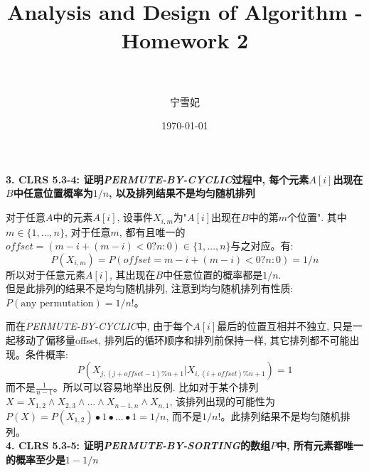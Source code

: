 \documentclass[paper=a4, fontsize=11pt]{scrartcl} %
\title{	
\normalfont \normalsize 
\horrule{0.5pt} \\[0.4cm] %
\huge Analysis and Design of Algorithm - Homework 2\\ %
\horrule{2pt} \\[0.5cm] %
}
\author{宁雪妃} %
\date{\normalsize\today} %
\numberwithin{equation}{section} %
\numberwithin{figure}{section} %
\numberwithin{table}{section} %
\begin{document}
\maketitle %



\textbf{3. CLRS 5.3-4: 证明\textit{PERMUTE-BY-CYCLIC}过程中, 每个元素$A[i]$出现在$B$中任意位置概率为$1/n$, 以及排列结果不是均匀随机排列}

对于任意$A$中的元素$A[i]$, 设事件$X_{i,m}$为"$A[i]$出现在$B$中的第$m$个位置". 其中$m \in \{1, \dots, n\}$, 对于任意$m$, 都有且唯一的$offset = (m - i + (m - i) < 0? n:0) \in \{1, \dots, n\}$与之对应。有:
\[
P(X_{i,m}) = P(offset = m - i + (m - i) < 0? n:0) = 1/n
\]
所以对于任意元素$A[i]$, 其出现在$B$中任意位置的概率都是$1/n$.
\\[2ex]
但是此排列的结果不是均匀随机排列, 注意到均匀随机排列有性质: $P(\mbox{any permutation}) = 1/n!$。

而在\textit{PERMUTE-BY-CYCLIC}中, 由于每个$A[i]$最后的位置互相并不独立, 只是一起移动了偏移量offset, 排列后的循环顺序和排列前保持一样, 其它排列都不可能出现。条件概率:
\[
P(X_{j, (j+offset-1) \% n + 1} | X_{i,(i+offset)\%n+1}) = 1
\]
而不是$\frac{1}{n-1}$。所以可以容易地举出反例. 比如对于某个排列$X = X_{1,2} \wedge X_{2,3} \wedge \dots \wedge X_{n-1,n} \wedge X_{n,1}$, 该排列出现的可能性为$P(X) = P(X_{1,2}) \bullet 1 \bullet \dots \bullet 1 = 1/n$, 而不是$1/n!$。此排列结果不是均匀随机排列。
\\[4ex]

\textbf{4. CLRS 5.3-5: 证明\textit{PERMUTE-BY-SORTING}的数组$P$中, 所有元素都唯一的概率至少是$1-1/n$}
\end{document}
